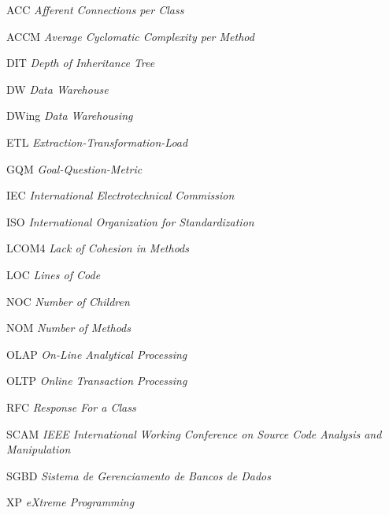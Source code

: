 \begin{siglas}

\item [ACC]   \textit{Afferent Connections per Class}
\item [ACCM]  \textit{Average Cyclomatic Complexity per Method}
\item [DIT]	  \textit{Depth of Inheritance Tree}
\item [DW]	  \textit{Data Warehouse}
\item [DWing] \textit{Data Warehousing}
\item [ETL]   \textit{Extraction-Transformation-Load}
\item [GQM]   \textit{Goal-Question-Metric}
\item [IEC]   \textit{International Electrotechnical Commission}
\item [ISO]   \textit{International Organization for Standardization}
\item [LCOM4] \textit{Lack of Cohesion in Methods}
\item [LOC]   \textit{Lines of Code}
\item [NOC]   \textit{Number of Children}
\item [NOM]   \textit{Number of Methods}
\item [OLAP]  \textit{On-Line Analytical Processing}
\item [OLTP]  \textit{Online Transaction Processing}
\item [RFC]   \textit{Response For a Class}
\item [SCAM]  \textit{IEEE International Working Conference on Source Code Analysis and Manipulation}
\item [SGBD]  \textit{Sistema de Gerenciamento de Bancos de Dados}
\item [XP]    \textit{eXtreme Programming}
  
\end{siglas}
